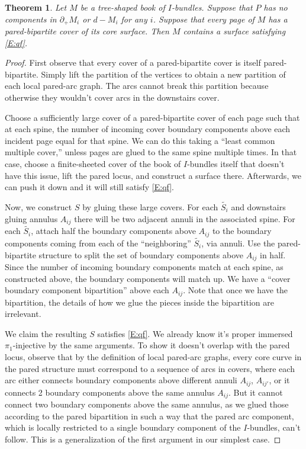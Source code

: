\documentclass[12pt]{amsart}
\newtheorem{thm}[theorem]{Theorem}
\theoremstyle{definition}
\newcommand{\bd}{\partial}
\begin{document}
\begin{thm}

Let $M$ be a tree-shaped book of $I$-bundles. Suppose that $P$ has no
components in $\bd_+M_i$ or $d-M_i$ for any $i$. Suppose that every page of $M$
has a pared-bipartite cover of its core surface. Then $M$ contains a surface
satisfying \eqref{E:qf}.

\end{thm}
\begin{proof}

First observe that every cover of a pared-bipartite cover is itself
pared-bipartite. Simply lift the partition of the vertices to obtain a new
partition of each local pared-arc graph. The arcs cannot break this
partition because otherwise they wouldn't cover arcs in the downstairs cover.

Choose a sufficiently large cover of a pared-bipartite cover of each page such
that at each spine, the number of incoming cover boundary components above each
incident page equal for that spine. We can do this taking a ``least common
multiple cover,'' unless pages are glued to the same spine multiple times. In
that case, choose a finite-sheeted cover of the book of $I$-bundles itself that
doesn't have this issue, lift the pared locus, and construct a surface there.
Afterwards, we can push it down and it will still satisfy \eqref{E:qf}.


Now, we construct $S$ by gluing these large covers. For each $\widetilde{S_i}$
and downstairs gluing annulus $A_{ij}$ there will be two adjacent annuli in the
associated spine. For each $\widetilde{S_i}$, attach half the boundary
components above $A_{ij}$ to the boundary components coming from each of the
``neighboring'' $\widetilde{S_i}$, via annuli. Use the pared-bipartite
structure to split the set of boundary components above $A_{ij}$ in half. Since
the number of incoming boundary components match at each spine, as constructed
above, the boundary components will match up. We have a ``cover boundary
component bipartition'' above each $A_{ij}$. Note that once we have the
bipartition, the details of how we glue the pieces inside the bipartition are
irrelevant.

We claim the resulting $S$ satisfies \eqref{E:qf}. We already know it's proper
immersed $\pi_1$-injective by the same arguments. To show it doesn't overlap
with the pared locus, observe that by the definition of local pared-arc graphs,
every core curve in the pared structure must correspond to a sequence of arcs
in covers, where each arc either connects boundary components above different
annuli $A_{ij}$, $A_{ij'}$, or it connects 2 boundary components above the same
annulus $A_{ij}$. But it cannot connect two boundary components above the same
annulus, as we glued those according to the pared bipartition in such a way
that the pared arc component, which is locally restricted to a single boundary
component of the $I$-bundles, can't follow. This is a generalization of the
first argument in our simplest case.


\end{proof}
\end{document}
